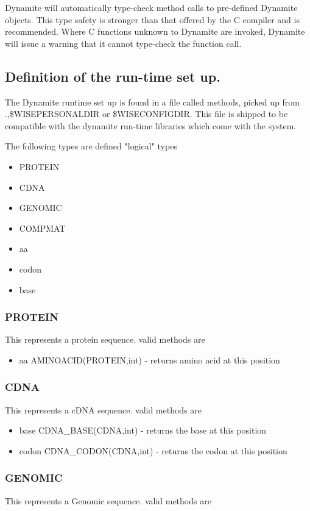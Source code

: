 Dynamite will automatically type-check method calls to pre-defined Dynamite
objects.
This type safety is stronger than that offered by the C compiler
and is recommended.
Where C functions unknown to Dynamite are invoked,
Dynamite will issue a warning that it cannot type-check the function call.

\subsection{Definition of the run-time set up.}
The Dynamite runtime set up is found in a file called methods, picked
up from .,\$WISEPERSONALDIR or \$WISECONFIGDIR. This file is shipped to
be compatible with the dynamite run-time libraries which come with the
system. 

The following types are defined "logical" types

\begin{itemize}
\item PROTEIN
\item CDNA
\item GENOMIC
\item COMPMAT
\item aa
\item codon
\item base
\end{itemize}

\subsubsection{PROTEIN}
This represents a protein sequence. valid methods are

\begin{itemize}
\item aa AMINOACID(PROTEIN,int) - returns amino acid at this position
\end{itemize}

\subsubsection{CDNA}
This represents a cDNA sequence. valid methods are

\begin{itemize}
\item base CDNA\_BASE(CDNA,int) - returns the base at this position
\item codon CDNA\_CODON(CDNA,int) - returns the codon at this position
\end{itemize}

\subsubsection{GENOMIC}
This represents a Genomic sequence. valid methods are

